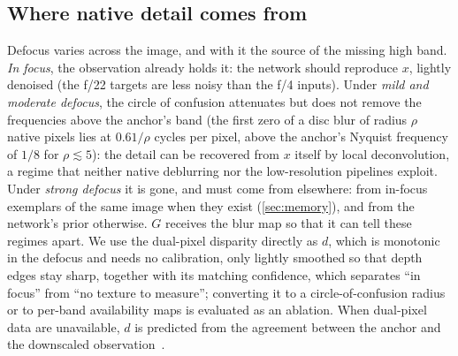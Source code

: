 \subsection{Where native detail comes from}
\label{sec:regimes}
Defocus varies across the image, and with it the source of the missing high band. \emph{In focus}, the
observation already holds it: the network should reproduce $x$, lightly denoised (the f/22 targets
are less noisy than the f/4 inputs). Under \emph{mild and moderate defocus}, the circle of confusion
attenuates but does not remove the frequencies above the anchor's band (the first zero of a disc
blur of radius $\rho$ native pixels lies at $0.61/\rho$ cycles per pixel, above the anchor's Nyquist
frequency of $1/8$ for $\rho \lesssim 5$): the detail can be recovered from $x$ itself by local
deconvolution, a regime that neither native deblurring nor the low-resolution pipelines exploit.
Under \emph{strong defocus} it is gone, and must come from elsewhere: from in-focus exemplars of the
same image when they exist (\cref{sec:memory}), and from the network's prior otherwise. $G$ receives
the blur map so that it can tell these regimes apart. We use the dual-pixel disparity directly as $d$,
which is monotonic in the defocus and needs no calibration, only lightly smoothed so that depth edges stay sharp,
together with its matching confidence, which separates ``in focus'' from ``no texture to measure''; converting it to a circle-of-confusion
radius or to per-band availability maps is evaluated as an ablation. When dual-pixel data are
unavailable, $d$ is predicted from the agreement between the anchor and the downscaled
observation~\cite{zhuo2011defocusmap}. 

